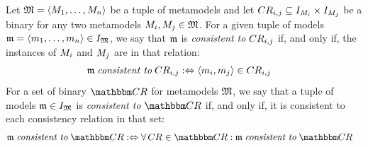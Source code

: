 \begin{definition} 
    \label{def:modellevelconsistency}
    Let $\mathfrak{M} =  \langle M_{1}, \dots, M_{n} \rangle$ be a tuple of metamodels and let $CR_{i,j} \subseteq I_{M_{i}} \times I_{M_{j}}$ be a binary \modellevelconsistencyrelation for any two metamodels $M_{i}, M_{j} \in \mathfrak{M}$. %
    For a given tuple of models $\modeltuple{m} = \tupled{\model{m}{1}, \dots, \model{m}{n}} \in \metamodeltupleinstanceset{M}{}%
    $, we say that $\mathfrak{m}$ is \emph{consistent to} $CR_{i,j}$ if, and only if, the instances of $M_{i}$ and $M_{j}$ are in that relation:
    \begin{align*} 
        &
        \modeltuple{m} %
        \consistenttomath \consistencyrelation{CR}{i,j} \equivalentperdefinition %
        \tupled{\model{m}{i},\model{m}{j}} \in \consistencyrelation{CR}{i,j}
    \end{align*}
    For a set of binary \modellevelconsistencyrelations $\consistencyrelationset{CR}$ for metamodels $\mathfrak{M}$, we say that a tuple of models $\mathfrak{m} \in I_{\mathfrak{M}}{}$ is \emph{consistent to} $\consistencyrelationset{CR}$ if, and only if, it is consistent to each consistency relation in that set:
    \begin{align*} 
        &
        \modeltuple{m} \consistenttomath \consistencyrelationset{CR} \equivalentperdefinition %
        \forall \consistencyrelation{CR}{} \in \consistencyrelationset{CR} : \modeltuple{m} \consistenttomath \consistencyrelationset{CR}
    \end{align*}
\end{definition}

